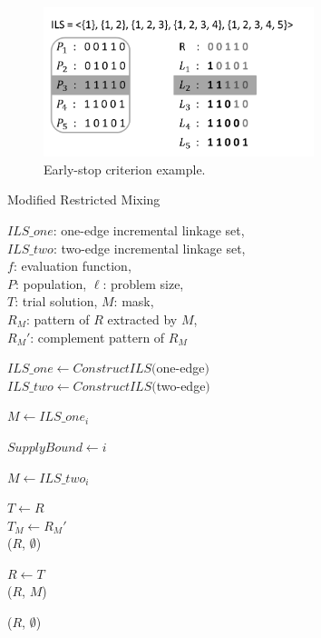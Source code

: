 \documentclass{sig-alternate-05-2015}
\begin{document}
\begin{figure}[t!]
\centering
\includegraphics[width=3.1in]{IsinP}
\caption{Early-stop criterion example.}
\end{figure}


\begin{algorithm}[th!]
\caption{Modified Restricted Mixing}\label{algo_disjdecomp}

$ILS\_one$: one-edge incremental linkage set,\\
$ILS\_two$: two-edge incremental linkage set,\\
$f$: evaluation function, \\
$P$: population, $\ell$: problem size, \\
$T$: trial solution, $M$: mask, \\
${R_M}$: pattern of $R$ extracted by $M$, \\
${R_M}'$: complement pattern of ${R_M}$



\BlankLine
$ILS\_one  \leftarrow ConstructILS($one-edge$)$\\
$ILS\_two  \leftarrow ConstructILS($two-edge$)$
\BlankLine
{} {
    $M \leftarrow ILS\_one_i$ \\
     {
        $ SupplyBound \leftarrow i$
       
    }
}

\BlankLine
{} {

    $M \leftarrow ILS\_two_i$ \\

     {

        $T \leftarrow R$ \\
        $T_M \leftarrow {R_M}'$ \\

         {
            \Return ($R$, $\emptyset$) 
        }

         {
            $R \leftarrow T$ \\
            \Return ($R$, $M$)
        }
    }
}
\Return ($R$, $\emptyset$) 
\end{algorithm}
\end{document}
